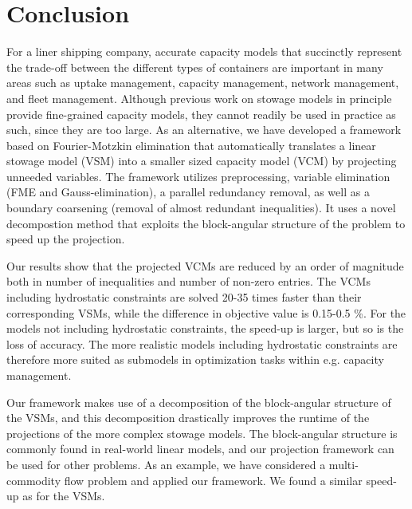 \documentclass{llncs}
\begin{document}
\color{red}{Note: Jeg har skåret lidt fra om forskellen til de to frameworks. Jeg har slettet en ``anden metode til projection'', fordi jeg pludselig blev i tvivl om ikke det bare er det samme som den første, jeg nævner}
\color{black}
\section{Conclusion}\label{sec:conclusion}
For a liner shipping company, accurate capacity models that succinctly represent the trade-off between the different types of containers are important in many areas such as uptake management, capacity management, network management, and fleet management. Although previous work on stowage models in principle provide fine-grained capacity models, they cannot readily be used in practice as such, since they are too large.
As an alternative, we have developed a framework based on Fourier-Motzkin elimination that automatically translates a linear stowage model (VSM) into a smaller sized capacity model (VCM) by projecting unneeded variables. The framework utilizes preprocessing, variable elimination (FME and Gauss-elimination), a parallel redundancy removal, as well as a boundary coarsening (removal of almost redundant inequalities). It uses a novel decompostion method that exploits the block-angular structure of the problem to speed up the projection.

Our results show that the projected VCMs are reduced by an order of magnitude both in number of inequalities and number of non-zero entries. The VCMs including hydrostatic constraints are solved 20-35 times faster than their corresponding VSMs, while the difference in objective value is 0.15-0.5 \%. For the models not including hydrostatic constraints, the speed-up is larger, but so is the loss of accuracy. The more realistic models including hydrostatic constraints are therefore more suited as submodels in optimization tasks within e.g. capacity management. 

Our framework makes use of a decomposition of the block-angular structure of the VSMs, and this decomposition drastically improves the runtime of the projections of the more complex stowage models. The block-angular structure is commonly found in real-world linear models, and our projection framework can be used for other problems. As an example, we have considered a multi-commodity flow problem and applied our framework. We found a similar speed-up as for the VSMs. 
\end{document}
